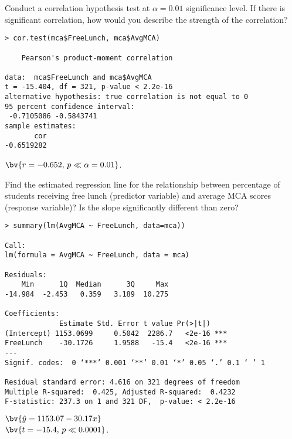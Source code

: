 \documentclass{article}
\begin{document}
\begin{flushleft}
\begin{enumalpha}
\item Conduct a correlation hypothesis test at $\alpha = 0.01$ significance level. If there is significant correlation, how would you describe the strength of the correlation?\\
\medskip
\begin{verbatim}
> cor.test(mca$FreeLunch, mca$AvgMCA)

	Pearson's product-moment correlation

data:  mca$FreeLunch and mca$AvgMCA
t = -15.404, df = 321, p-value < 2.2e-16
alternative hypothesis: true correlation is not equal to 0
95 percent confidence interval:
 -0.7105086 -0.5843741
sample estimates:
       cor 
-0.6519282 
\end{verbatim}

$\bv{r = -0.652, \, p  \ll  \alpha = 0.01}$. 

\newpage
\item Find the estimated regression line for the relationship between percentage of students receiving free lunch (predictor variable) and average MCA scores (response variable)? Is the slope significantly different than zero?\\
\medskip
\begin{verbatim}
> summary(lm(AvgMCA ~ FreeLunch, data=mca))

Call:
lm(formula = AvgMCA ~ FreeLunch, data = mca)

Residuals:
    Min      1Q  Median      3Q     Max 
-14.984  -2.453   0.359   3.189  10.275 

Coefficients:
             Estimate Std. Error t value Pr(>|t|)    
(Intercept) 1153.0699     0.5042  2286.7   <2e-16 ***
FreeLunch    -30.1726     1.9588   -15.4   <2e-16 ***
---
Signif. codes:  0 ‘***’ 0.001 ‘**’ 0.01 ‘*’ 0.05 ‘.’ 0.1 ‘ ’ 1

Residual standard error: 4.616 on 321 degrees of freedom
Multiple R-squared:  0.425,	Adjusted R-squared:  0.4232 
F-statistic: 237.3 on 1 and 321 DF,  p-value: < 2.2e-16
\end{verbatim}

$\bv{\hat y = 1153.07 - 30.17 x}$\\
$\bv{t = -15.4, \, p \ll 0.0001}$. 
\vspace{.5in}


\end{enumalpha}
\end{flushleft}
\end{document}
